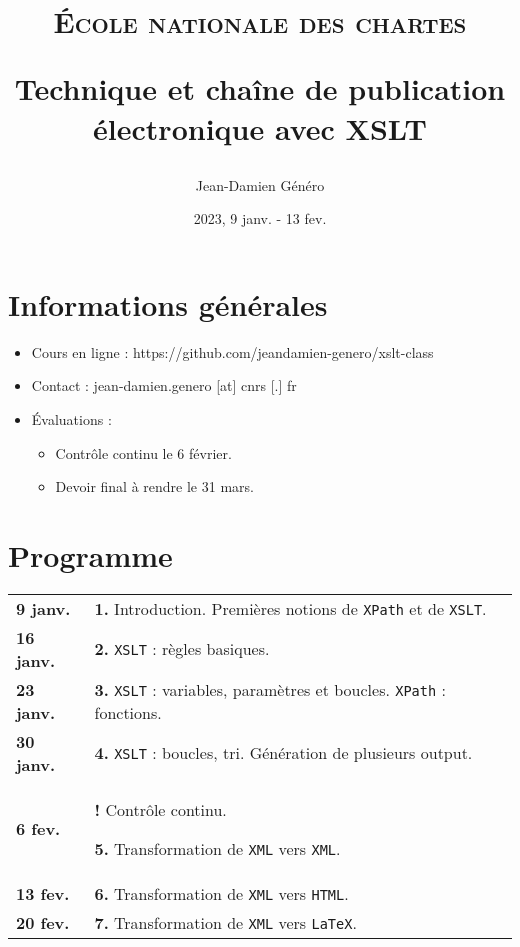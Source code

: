 \documentclass[a4paper]{article}
\title{\textsc{École nationale des chartes}

\bigskip

Technique et chaîne de publication électronique avec XSLT}
\author{Jean-Damien Généro}
\date{2023, 9 janv. - 13 fev.}
\begin{document}
\maketitle

\section*{Informations générales}

\begin{itemize}
    \item Cours en ligne : https://github.com/jeandamien-genero/xslt-class
    \item Contact : jean-damien.genero [at] cnrs [.] fr
    \item Évaluations :
    \begin{itemize}
        \item Contrôle continu le 6 février.
        \item Devoir final à rendre le 31 mars.
    \end{itemize}
\end{itemize}

\bigskip

\section*{Programme}

\renewcommand{\arraystretch}{1.5}
\begin{center}
    \begin{tabular}[h]{|p{1.5cm} p{9.6cm}}
        \textbf{9 janv.} & \textbf{1.} Introduction. Premières notions de \texttt{XPath} et de \texttt{XSLT}.\\
        \textbf{16 janv.} & \textbf{2.} \texttt{XSLT} : règles basiques.  \\
        \textbf{23 janv.} & \textbf{3.} \texttt{XSLT} : variables, paramètres et boucles. \texttt{XPath} : fonctions. \\
        \textbf{30 janv.} & \textbf{4.} \texttt{XSLT} :  boucles, tri. Génération de plusieurs output. \\
        \textbf{6 fev.} & \textbf{!}  Contrôle continu.
        
        \textbf{5.} Transformation de \texttt{XML}  vers \texttt{XML}. \\
        \textbf{13 fev.} & \textbf{6.} Transformation de \texttt{XML}  vers \texttt{HTML}. \\
        \textbf{20 fev.} & \textbf{7.} Transformation de \texttt{XML}  vers \texttt{LaTeX}. \\
    \end{tabular}
\end{center}
\end{document}
